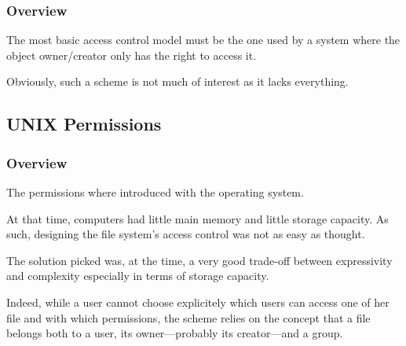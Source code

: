 
\begin{frame}
  \frametitle{Overview}

  The most basic access control model must be the one used by a system where
  the object owner/creator only has the right to access it.

  \-

  Obviously, such a scheme is not much of interest as it lacks everything.
\end{frame}


\subsection{UNIX Permissions}


\begin{frame}
  \frametitle{Overview}

  The  permissions where introduced with the 
  operating system.

  \-

  At that time, computers had little main memory and little storage capacity.
  As such, designing the file system's access control was not as easy as
  thought.

  \-

  The solution picked was, at the time, a very good trade-off between
  expressivity and complexity especially in terms of storage capacity.

  \-

  Indeed, while a user cannot choose explicitely which users can access one of
  her file and with which permissions, the  scheme relies on the
  concept that a file belongs both to a user, its owner---probably its
  creator---and a group.
\end{frame}



